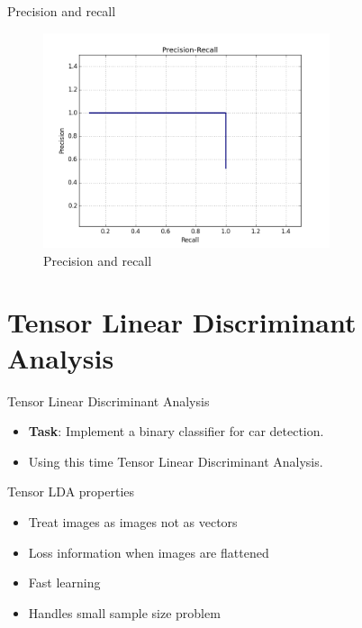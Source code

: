 \documentclass[handout]{beamer}
\begin{document}
\begin{frame}{Precision and recall}
    {\centering
    \begin{figure}[H]
        \includegraphics[width=0.75\textwidth]{project_03/precision.png}
        \caption{Precision and recall}
    \end{figure}
    }
\end{frame}

\section{Tensor Linear Discriminant Analysis}
\begin{frame}{Tensor Linear Discriminant Analysis}
    \begin{itemize}
        \item \textbf{Task}: Implement a binary classifier for car detection.
        \item Using this time Tensor Linear Discriminant Analysis.
    \end{itemize}
\end{frame}
\note{}

\begin{frame}{Tensor LDA properties}
    \begin{itemize}
        \item Treat images as images not as vectors
        \item Loss information when images are flattened
        \item Fast learning
        \item Handles small sample size problem
    \end{itemize}
\end{frame}
\note{}
\end{document}
